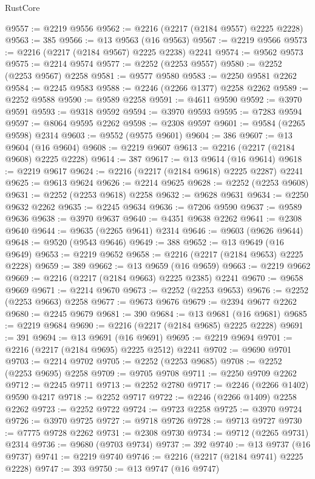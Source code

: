 \begin{lexlean}{RustCore}
\begin{coremodule}
@9557 := @2219 @9556
@9562 := @2216 (@2217 (@2184 @9557) @2225 @2228)
@9563 := 385
@9566 := @13 @9563 (@16 @9563)
@9567 := @2219 @9566
@9573 := @2216 (@2217 (@2184 @9567) @2225 @2238) @2241
@9574 := @9562 @9573
@9575 := @2214 @9574
@9577 := @2252 (@2253 @9557)
@9580 := @2252 (@2253 @9567) @2258
@9581 := @9577 @9580
@9583 := @2250 @9581 @2262
@9584 := @2245 @9583
@9588 := @2246 (@2266 @1377) @2258 @2262
@9589 := @2252 @9588
@9590 := @9589 @2258
@9591 := @4611 @9590
@9592 := @3970 @9591
@9593 := @9318 @9592
@9594 := @3970 @9593
@9595 := @7283 @9594
@9597 := @8064 @9595 @2262
@9598 := @2308 @9597
@9601 := @9584 (@2265 @9598) @2314
@9603 := @9552 (@9575 @9601)
@9604 := 386
@9607 := @13 @9604 (@16 @9604)
@9608 := @2219 @9607
@9613 := @2216 (@2217 (@2184 @9608) @2225 @2228)
@9614 := 387
@9617 := @13 @9614 (@16 @9614)
@9618 := @2219 @9617
@9624 := @2216 (@2217 (@2184 @9618) @2225 @2287) @2241
@9625 := @9613 @9624
@9626 := @2214 @9625
@9628 := @2252 (@2253 @9608)
@9631 := @2252 (@2253 @9618) @2258
@9632 := @9628 @9631
@9634 := @2250 @9632 @2262
@9635 := @2245 @9634
@9636 := @7206 @9590
@9637 := @9589 @9636
@9638 := @3970 @9637
@9640 := @4351 @9638 @2262
@9641 := @2308 @9640
@9644 := @9635 (@2265 @9641) @2314
@9646 := @9603 (@9626 @9644)
@9648 := @9520 (@9543 @9646)
@9649 := 388
@9652 := @13 @9649 (@16 @9649)
@9653 := @2219 @9652
@9658 := @2216 (@2217 (@2184 @9653) @2225 @2228)
@9659 := 389
@9662 := @13 @9659 (@16 @9659)
@9663 := @2219 @9662
@9669 := @2216 (@2217 (@2184 @9663) @2225 @2385) @2241
@9670 := @9658 @9669
@9671 := @2214 @9670
@9673 := @2252 (@2253 @9653)
@9676 := @2252 (@2253 @9663) @2258
@9677 := @9673 @9676
@9679 := @2394 @9677 @2262
@9680 := @2245 @9679
@9681 := 390
@9684 := @13 @9681 (@16 @9681)
@9685 := @2219 @9684
@9690 := @2216 (@2217 (@2184 @9685) @2225 @2228)
@9691 := 391
@9694 := @13 @9691 (@16 @9691)
@9695 := @2219 @9694
@9701 := @2216 (@2217 (@2184 @9695) @2225 @2512) @2241
@9702 := @9690 @9701
@9703 := @2214 @9702
@9705 := @2252 (@2253 @9685)
@9708 := @2252 (@2253 @9695) @2258
@9709 := @9705 @9708
@9711 := @2250 @9709 @2262
@9712 := @2245 @9711
@9713 := @2252 @2780
@9717 := @2246 (@2266 @1402) @9590 @4217
@9718 := @2252 @9717
@9722 := @2246 (@2266 @1409) @2258 @2262
@9723 := @2252 @9722
@9724 := @9723 @2258
@9725 := @3970 @9724
@9726 := @3970 @9725
@9727 := @9718 @9726
@9728 := @9713 @9727
@9730 := @7775 @9728 @2262
@9731 := @2308 @9730
@9734 := @9712 (@2265 @9731) @2314
@9736 := @9680 (@9703 @9734)
@9737 := 392
@9740 := @13 @9737 (@16 @9737)
@9741 := @2219 @9740
@9746 := @2216 (@2217 (@2184 @9741) @2225 @2228)
@9747 := 393
@9750 := @13 @9747 (@16 @9747)

\end{coremodule}
\end{lexlean}
